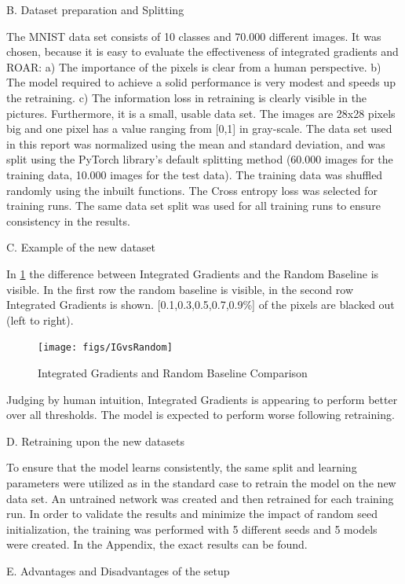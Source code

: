 B. Dataset preparation and Splitting

The MNIST data set consists of 10 classes and 70.000 different images. It was chosen, because it is easy to evaluate the effectiveness of integrated gradients and ROAR: a) The importance of the pixels is clear from a human perspective. b) The model required to achieve a solid performance is very modest and speeds up the retraining. c) The information loss in retraining is clearly visible in the pictures. Furthermore, it is a small, usable data set. The images are 28x28 pixels big and one pixel has a value ranging from [0,1] in gray-scale. The data set used in this report was normalized using the mean and standard deviation, and was split using the PyTorch library’s default splitting method (60.000 images for the training data, 10.000 images for the test data). The training data was shuffled randomly using the inbuilt functions. The Cross entropy loss was selected for training runs. The same data set split was used for all training runs to ensure consistency in the results.

C. Example of the new dataset

In \ref{fig:IGvsRandom} the difference between Integrated Gradients and the Random Baseline is visible. In the first row the random baseline is visible, in the second row Integrated Gradients is shown. [0.1,0.3,0.5,0.7,0.9\%] of the pixels are blacked out (left to right).

\begin{figure}[h!]
	\centering
	\texttt{[image: figs/IGvsRandom]}
	\caption{Integrated Gradients and Random Baseline Comparison}
	\label{fig:IGvsRandom}
\end{figure}

Judging by human intuition, Integrated Gradients is appearing to perform better over all thresholds. The model is expected to perform worse following retraining.

D. Retraining upon the new datasets

To ensure that the model learns consistently, the same split and learning parameters were utilized as in the standard case to retrain the model on the new data set. An untrained network was created and then retrained for each training run. In order to validate the results and minimize the impact of random seed initialization, the training was performed with 5 different seeds and 5 models were created. In the Appendix, the exact results can be found.

E. Advantages and Disadvantages of the setup

